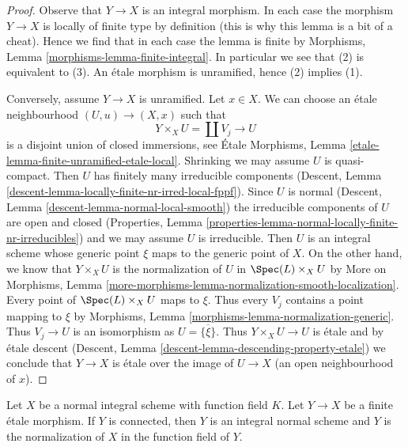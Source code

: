 \begin{proof}
Observe that $Y \to X$ is an integral morphism.
In each case the morphism $Y \to X$ is locally of finite type
by definition (this is why this lemma is a bit of a cheat).
Hence we find that in each case the lemma is finite by
Morphisms, Lemma \ref{morphisms-lemma-finite-integral}.
In particular we see that (2) is equivalent to (3).
An \'etale morphism is unramified, hence (2) implies (1).

\medskip\noindent
Conversely, assume $Y \to X$ is unramified. Let $x \in X$.
We can choose an \'etale neighbourhood $(U, u) \to (X, x)$ such that
$$
Y \times_X U = \coprod V_j \longrightarrow U
$$
is a disjoint union of closed immersions, see
\'Etale Morphisms, Lemma \ref{etale-lemma-finite-unramified-etale-local}.
Shrinking we may assume $U$ is quasi-compact.
Then $U$ has finitely many irreducible components
(Descent, Lemma \ref{descent-lemma-locally-finite-nr-irred-local-fppf}).
Since $U$ is normal
(Descent, Lemma \ref{descent-lemma-normal-local-smooth}) the
irreducible components of $U$ are open and closed
(Properties, Lemma \ref{properties-lemma-normal-locally-finite-nr-irreducibles})
and we may assume $U$ is irreducible. Then $U$ is an integral
scheme whose generic point $\xi$ maps to the generic point of $X$.
On the other hand, we know that $Y \times_X U$
is the normalization of $U$ in $\Spec(L) \times_X U$
by More on Morphisms, Lemma
\ref{more-morphisms-lemma-normalization-smooth-localization}.
Every point of $\Spec(L) \times_X U$ maps to $\xi$.
Thus every $V_j$ contains a point mapping to $\xi$ by
Morphisms, Lemma \ref{morphisms-lemma-normalization-generic}.
Thus $V_j \to U$ is an isomorphism as $U = \overline{\{\xi\}}$.
Thus $Y \times_X U \to U$ is \'etale and by \'etale descent
(Descent, Lemma \ref{descent-lemma-descending-property-etale})
we conclude that $Y \to X$ is \'etale over the
image of $U \to X$ (an open neighbourhood of $x$).
\end{proof}

\begin{lemma}
\label{lemma-finite-etale-covering-normal-unramified}
Let $X$ be a normal integral scheme with function field $K$.
Let $Y \to X$ be a finite \'etale morphism. If $Y$ is connected,
then $Y$ is an integral normal scheme and $Y$ is the normalization
of $X$ in the function field of $Y$.
\end{lemma}

